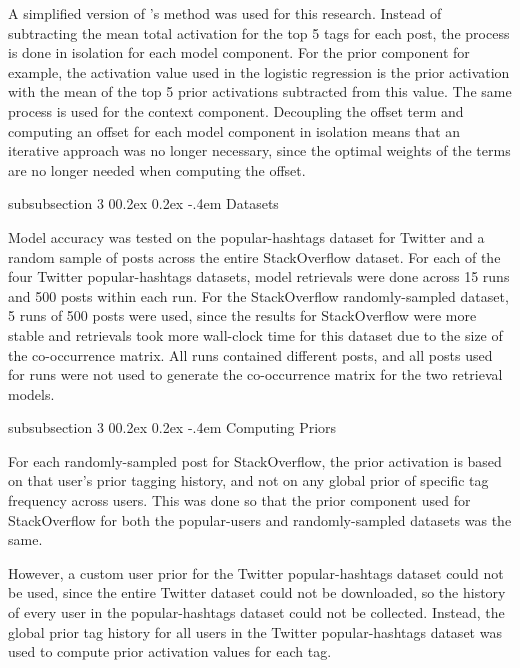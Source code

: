 \documentclass[man,floatsintext,donotrepeattitle]{apa6}
\makeatletter
\renewcommand{\subsubsection}{%
  \@startsection
  {subsubsection}%
  {3}%
  {\parindent}%
  {0\baselineskip \@plus 0.2ex \@minus 0.2ex}%
  {-.4em}%
  {\normalfont\normalsize\bfseries\addperi}}
\makeatother
\begin{document}
A simplified version of \textcite{Stanley2013}'s method was used for this research.
Instead of subtracting the mean total activation for the top 5 tags for each post, the process is done in isolation for each model component.
For the prior component for example, the activation value used in the logistic regression is the prior activation with the mean of the top 5 prior activations subtracted from this value.
The same process is used for the context component.
Decoupling the offset term and computing an offset for each model component in isolation means that an iterative approach was no longer necessary,
since the optimal weights of the terms are no longer needed when computing the offset.

\subsubsection{Datasets}

Model accuracy was tested on the popular-hashtags dataset for Twitter and a random sample of posts across the entire StackOverflow dataset.
For each of the four Twitter popular-hashtags datasets, model retrievals were done across 15 runs and 500 posts within each run.
For the StackOverflow randomly-sampled dataset, 5 runs of 500 posts were used,
since the results for StackOverflow were more stable and retrievals took more wall-clock time for this dataset due to the size of the co-occurrence matrix.
All runs contained different posts, and all posts used for runs were not used to generate the co-occurrence matrix for the two retrieval models.

\subsubsection{Computing Priors}

For each randomly-sampled post for StackOverflow, the prior activation is based on that user's prior tagging history, and not on any global prior of specific tag frequency across users.
This was done so that the prior component used for StackOverflow for both the popular-users and randomly-sampled datasets was the same.

However, a custom user prior for the Twitter popular-hashtags dataset could not be used, since the entire Twitter dataset could not be downloaded, so the history of every user in the popular-hashtags dataset could not be collected.
Instead, the global prior tag history for all users in the Twitter popular-hashtags dataset was used to compute prior activation values for each tag.
\end{document}
